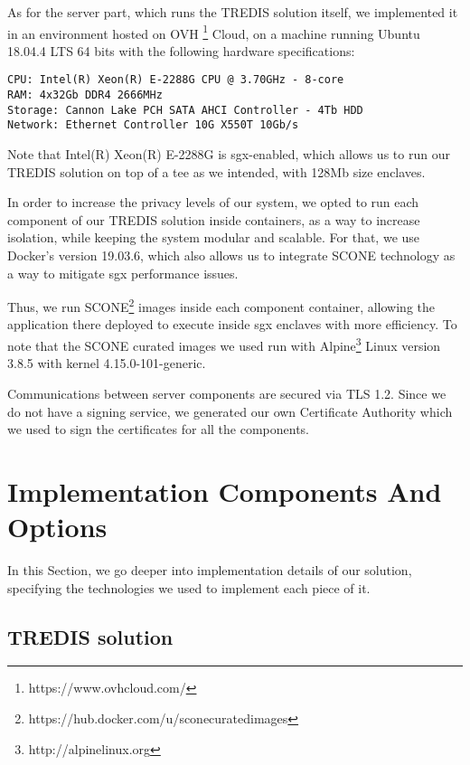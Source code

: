 As for the server part, which runs the TREDIS solution itself, we implemented it in an environment hosted on OVH \footnote{https://www.ovhcloud.com/} Cloud, on a machine running Ubuntu 18.04.4 LTS 64 bits with the following hardware specifications: 
\vspace{5mm}
\begin{lstlisting}
CPU: Intel(R) Xeon(R) E-2288G CPU @ 3.70GHz - 8-core
RAM: 4x32Gb DDR4 2666MHz 
Storage: Cannon Lake PCH SATA AHCI Controller - 4Tb HDD
Network: Ethernet Controller 10G X550T 10Gb/s
\end{lstlisting}
\vspace{3mm}

Note that Intel(R) Xeon(R) E-2288G is \gls{sgx}-enabled, which allows us to run our TREDIS solution on top of a \gls{tee} as we intended, with 128Mb size enclaves. 

In order to increase the privacy levels of our system, we opted to run each component of our TREDIS solution inside containers, as a way to increase isolation, while keeping the system modular and scalable. 
For that, we use Docker's version 19.03.6, which also allows us to integrate SCONE technology as a way to mitigate \gls{sgx} performance issues. 

Thus, we run SCONE\footnote{https://hub.docker.com/u/sconecuratedimages} images  inside each component container, allowing the application there deployed to execute inside \gls{sgx} enclaves with more efficiency. 
To note that the SCONE curated images we used run with Alpine\footnote{http://alpinelinux.org} Linux version 3.8.5 with kernel 4.15.0-101-generic.

Communications between server components are secured via TLS 1.2. Since we do not have a signing service, we generated our own Certificate Authority which we used to sign the certificates for all the components. 



\section{Implementation Components And Options}
\label{sec:implementationComponents}

In this Section, we go deeper into implementation details of our solution, specifying the technologies we used to implement each piece of it.


\subsection{TREDIS solution}
\label{ssec:TREDIS_impl_components}

